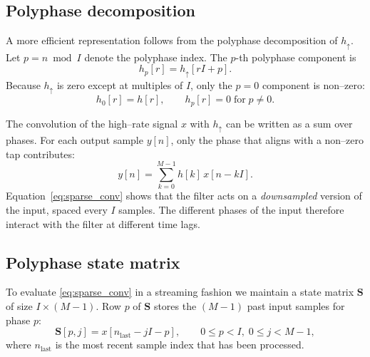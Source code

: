 \documentclass[a4paper,11pt]{article}
\begin{document}
\subsection{Polyphase decomposition}

A more efficient representation follows from the polyphase decomposition of $h_{\uparrow}$.  Let $p = n \bmod I$ denote the polyphase index.  The $p$-th polyphase component is
\begin{equation}
    h_p[r] = h_{\uparrow}[rI + p] .
\end{equation}
Because $h_{\uparrow}$ is zero except at multiples of $I$, only the $p=0$ component is non--zero:
\begin{equation}
    h_0[r] = h[r], \qquad h_p[r] = 0 \;\text{for}\; p \neq 0 .
\end{equation}

The convolution of the high--rate signal $x$ with $h_{\uparrow}$ can be written as a sum over phases.  For each output sample $y[n]$, only the phase that aligns with a non--zero tap contributes:
\begin{equation}
    y[n] = \sum_{k=0}^{M-1} h[k]\, x[n - kI] .
    \label{eq:sparse_conv}
\end{equation}
Equation~\eqref{eq:sparse_conv} shows that the filter acts on a \emph{downsampled} version of the input, spaced every $I$ samples.  The different phases of the input therefore interact with the filter at different time lags.

\subsection{Polyphase state matrix}

To evaluate \eqref{eq:sparse_conv} in a streaming fashion we maintain a state matrix $\mathbf{S}$ of size $I \times (M-1)$.  Row $p$ of $\mathbf{S}$ stores the $(M-1)$ past input samples for phase $p$:
\begin{equation}
    \mathbf{S}[p, j] = x[n_{\text{last}} - jI - p] ,
    \qquad 0 \le p < I, \; 0 \le j < M-1 ,
\end{equation}
where $n_{\text{last}}$ is the most recent sample index that has been processed.
\end{document}
